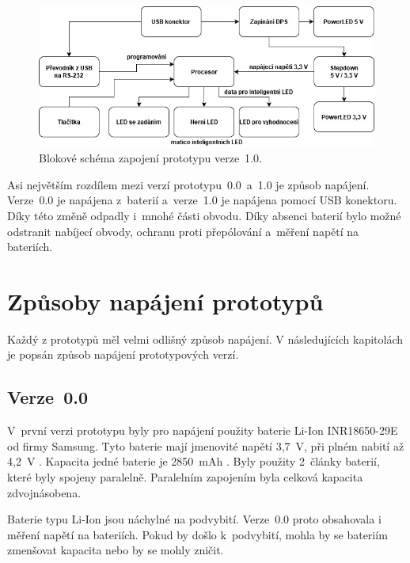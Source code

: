   \begin{figure}[!h]
    \begin{center}
      \includegraphics[scale=0.5]{obrazky/v1_blokove_schema.jpg}
    \end{center}
    \caption[Blokové schéma zapojení prototypu verze~1.0]{Blokové schéma zapojení prototypu verze~1.0.}
  \end{figure}

  Asi největším rozdílem mezi verzí prototypu~0.0~a~1.0 je způsob napájení. Verze~0.0 je napájena z~baterií a~verze~1.0 je napájena pomocí USB 
  konektoru. Díky této změně 
  odpadly i~mnohé části obvodu. Díky absenci baterií bylo možné odstranit nabíjecí obvody, ochranu proti přepólování a~měření napětí 
  na bateriích.       

  \section{Způsoby napájení prototypů}
  Každý z prototypů měl velmi odlišný způsob napájení. V následujících kapitolách je popsán způsob napájení prototypových verzí.

  \subsection{Verze~0.0}
  V~první verzi prototypu byly pro napájení použity baterie Li-Ion INR18650-29E od firmy Samsung. Tyto baterie mají jmenovité napětí 3,7~V, 
  při plném nabití až 4,2~V \cite{18650}. Kapacita jedné baterie je 2850~mAh \cite{18650}. Byly použity 2~články baterií, které byly spojeny 
  paralelně. Paralelním zapojením byla celková kapacita zdvojnásobena.

  Baterie typu Li-Ion jsou náchylné na podvybití. Verze~0.0 proto obsahovala i měření napětí na bateriích. Pokud by došlo k~podvybití, mohla 
  by se bateriím zmenšovat kapacita nebo by se mohly zničit. 

